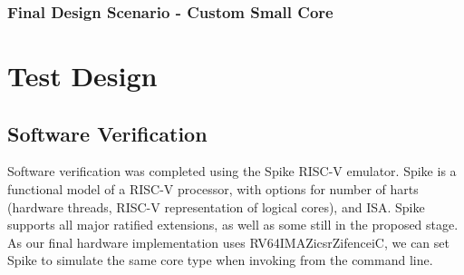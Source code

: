 \subsection{Final Design Scenario - Custom Small Core}


\chapter{Test Design}
\label{ch:test_design}

\section{Software Verification}
Software verification was completed using the Spike RISC-V emulator. Spike is a functional model of a RISC-V processor, with options for number of harts (hardware threads, RISC-V representation of logical cores), and ISA. Spike supports all major ratified extensions, as well as some still in the proposed stage. As our final hardware implementation uses RV64IMAZicsrZifenceiC, we can set Spike to simulate the same core type when invoking from the command line.

